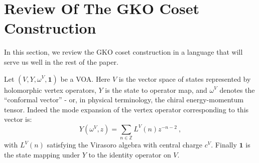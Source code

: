 \documentclass[a4paper,11pt]{article}
\newcommand{\tsf}[1]{\textsf{#1}}
\def\IZ{{\mathds{Z}}}
\begin{document}


\section{Review Of The \tsf{GKO} Coset Construction}\label{sec:GKO_review}


In this section, we review the \tsf{GKO} coset construction in a language that will serve us well in the rest of the paper.
\par
Let $(V,Y,\omega^V,\mathbf{1})$ be a \tsf{VOA}. Here $V$ is the vector space of states represented by holomorphic vertex operators, $Y$ is the state to operator map, and $\omega^V$   denotes the ``conformal vector'' - or, in physical terminology, the chiral energy-momentum tensor. Indeed the mode expansion of the vertex 
operator corresponding to this vector  is: 
%
%
\begin{equation}
Y(\omega^V,z)=\sum_{n\in\IZ}L^V(n)z^{-n-2}~,
\end{equation} 
%
with $L^V(n)$ satisfying the Virasoro algebra  with central charge $c^V$. Finally 
$\mathbf{1}$ is the state mapping under $Y$ to the identity operator on $V$. 
\end{document}
